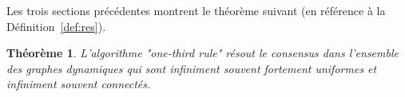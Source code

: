 \documentclass{article}
\newtheorem{theorem}{Théorème}
\begin{document}
Les trois sections précédentes montrent le th\'eor\`eme suivant (en r\'ef\'erence \`a la D\'efinition~\ref{def:res}). 
\begin{theorem}
L'algorithme "one-third rule" r\'esout  le consensus dans l'ensemble des graphes dynamiques 
	qui sont infiniment souvent  fortement uniformes et infiniment souvent  connect\'es. 
\end{theorem}
\end{document}
